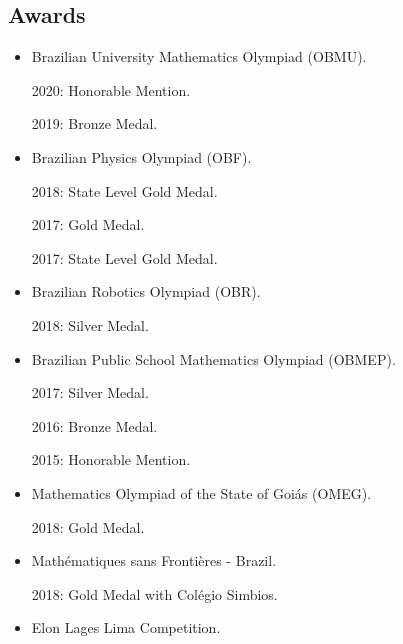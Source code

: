 \documentclass[a4paper]{article}
\begin{document}
\begin{paracol}{2}
\vspace{-1.0em}

\section*{\faAward \; Awards}
\scriptsize
\begin{minipage}[t]{0.23\textwidth}
\begin{itemize}
\item Brazilian University Mathematics Olympiad (OBMU).

2020: Honorable Mention.

2019: Bronze Medal.

\item Brazilian Physics Olympiad (OBF).

2018: State Level Gold Medal.

2017: Gold Medal.

2017: State Level Gold Medal.

\item Brazilian Robotics Olympiad (OBR).

2018: Silver Medal.

\end{itemize}
\end{minipage}
\begin{minipage}[t]{0.23\textwidth}
\begin{itemize}
\item Brazilian Public School \newline Mathematics Olympiad (OBMEP).

2017: Silver Medal.

2016: Bronze Medal.

2015: Honorable Mention.

\item Mathematics Olympiad of the State of Goiás (OMEG).

2018: Gold Medal.

\item Mathématiques sans Frontières - Brazil.

2018: Gold Medal with Colégio Simbios.

\end{itemize}
\end{minipage}
\begin{minipage}[t]{0.23\textwidth}
\begin{itemize}
\item Elon Lages Lima Competition.


\end{itemize}
\end{minipage}
\end{paracol}
\end{document}

